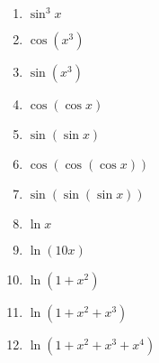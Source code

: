 \documentclass{article}
\begin{document}
\begin{multicols}{3}
\begin{enumerate}
    \item $\sin^3 x$
    \item $\cos(x^3)$
    \item $\sin(x^3)$
    \item $\cos(\cos x)$
    \item $\sin(\sin x)$
    \item $\cos(\cos(\cos x))$
    \item $\sin(\sin(\sin x))$
    \item $\ln x$
    \item $\ln(10x)$
    \item $\ln(1+x^2)$
    \item $\ln(1+x^2+x^3)$
    \item $\ln(1+x^2+x^3+x^4)$
\end{enumerate}
\end{multicols}
\end{document}
